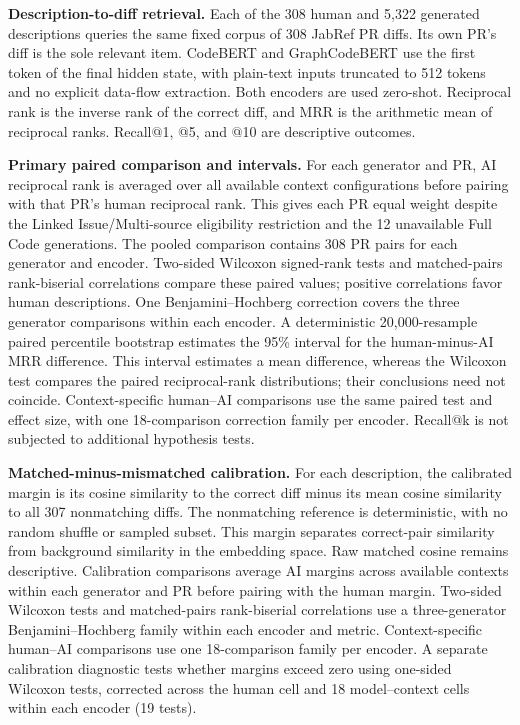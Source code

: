 \documentclass[11pt,a4paper]{article}
\begin{document}
\textbf{Description-to-diff retrieval.}
Each of the 308 human and 5,322 generated descriptions queries the same fixed corpus of 308 JabRef PR diffs. Its own PR's diff is the sole relevant item. CodeBERT and GraphCodeBERT use the first token of the final hidden state, with plain-text inputs truncated to 512 tokens and no explicit data-flow extraction. Both encoders are used zero-shot. Reciprocal rank is the inverse rank of the correct diff, and MRR is the arithmetic mean of reciprocal ranks. Recall@1, @5, and @10 are descriptive outcomes.

\textbf{Primary paired comparison and intervals.}
For each generator and PR, AI reciprocal rank is averaged over all available context configurations before pairing with that PR's human reciprocal rank. This gives each PR equal weight despite the Linked Issue/Multi-source eligibility restriction and the 12 unavailable Full Code generations. The pooled comparison contains 308 PR pairs for each generator and encoder. Two-sided Wilcoxon signed-rank tests and matched-pairs rank-biserial correlations compare these paired values; positive correlations favor human descriptions. One Benjamini--Hochberg correction covers the three generator comparisons within each encoder. A deterministic 20,000-resample paired percentile bootstrap estimates the 95\% interval for the human-minus-AI MRR difference. This interval estimates a mean difference, whereas the Wilcoxon test compares the paired reciprocal-rank distributions; their conclusions need not coincide. Context-specific human--AI comparisons use the same paired test and effect size, with one 18-comparison correction family per encoder. Recall@k is not subjected to additional hypothesis tests.

\textbf{Matched-minus-mismatched calibration.}
For each description, the calibrated margin is its cosine similarity to the correct diff minus its mean cosine similarity to all 307 nonmatching diffs. The nonmatching reference is deterministic, with no random shuffle or sampled subset. This margin separates correct-pair similarity from background similarity in the embedding space. Raw matched cosine remains descriptive. Calibration comparisons average AI margins across available contexts within each generator and PR before pairing with the human margin. Two-sided Wilcoxon tests and matched-pairs rank-biserial correlations use a three-generator Benjamini--Hochberg family within each encoder and metric. Context-specific human--AI comparisons use one 18-comparison family per encoder. A separate calibration diagnostic tests whether margins exceed zero using one-sided Wilcoxon tests, corrected across the human cell and 18 model--context cells within each encoder (19 tests).
\end{document}
